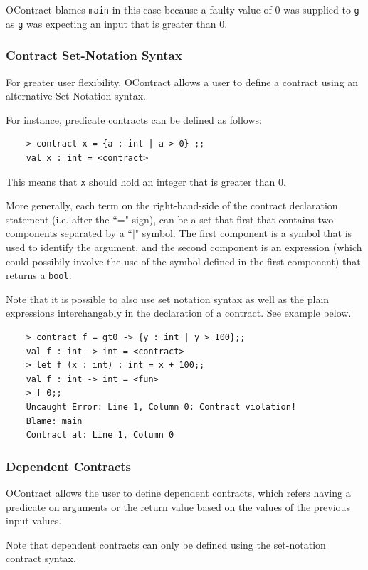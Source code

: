 \documentclass[a4paper]{article}
\begin{document}
OContract blames \texttt{main} in this case because a faulty value of 0 was supplied to \texttt{g} as \texttt{g} was expecting an input that is greater than 0.

\subsubsection{Contract Set-Notation Syntax}

For greater user flexibility, OContract allows a user to define a contract using an alternative Set-Notation syntax.

For instance, predicate contracts can be defined as follows:

\begin{verbatim}
    > contract x = {a : int | a > 0} ;;
    val x : int = <contract>
\end{verbatim}

This means that \texttt{x} should hold an integer that is greater than 0.

More generally, each term on the right-hand-side of the contract declaration statement (i.e. after the ``=" sign), can be a set that first that contains two components separated by a ``$\vert$" symbol.
The first component is a symbol that is used to identify the argument, and the second component is an expression (which could possibily involve the use of the symbol defined in the first component) that returns a \texttt{bool}.

Note that it is possible to also use set notation syntax as well as the plain expressions interchangably in the declaration of a contract. See example below.

\begin{verbatim}
    > contract f = gt0 -> {y : int | y > 100};;
    val f : int -> int = <contract>
    > let f (x : int) : int = x + 100;;
    val f : int -> int = <fun>
    > f 0;;
    Uncaught Error: Line 1, Column 0: Contract violation!
    Blame: main
    Contract at: Line 1, Column 0
\end{verbatim}

\subsubsection{Dependent Contracts}

OContract allows the user to define dependent contracts, which refers having a predicate on arguments or the return value based on the values of the previous input values.

Note that dependent contracts can only be defined using the set-notation contract syntax.
\end{document}
